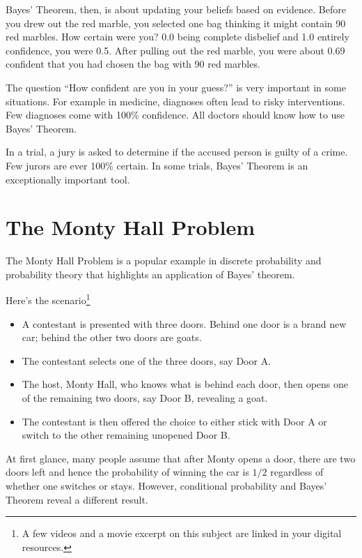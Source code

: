 Bayes' Theorem, then, is about updating your beliefs based on
evidence.  Before you drew out the red marble, you selected one bag
thinking it might contain 90 red marbles. How certain were you? 0.0 being complete disbelief and 1.0 entirely
confidence, you were 0.5. After pulling out the red marble, you were about 0.69
confident that you had chosen the bag with 90 red marbles.

The question ``How confident are you in your guess?'' is very
important in some situations. For example in medicine, diagnoses often
lead to risky interventions. Few diagnoses come with 100\% confidence.
All doctors should know how to use Bayes' Theorem. 

In a trial, a jury is asked to determine if the accused person is
guilty of a crime. Few jurors are ever 100\% certain. In some trials, Bayes'
Theorem is an exceptionally important tool.

\section{The Monty Hall Problem}

The Monty Hall Problem is a popular example in discrete probability and probability theory that highlights an application of Bayes' theorem. 

Here's the scenario\footnote{A few videos and a movie excerpt on this subject are linked in your digital resources.}
\begin{itemize}
    \item A contestant is presented with three doors. Behind one door is a brand new car; behind the other two doors are goats.
    \item The contestant selects one of the three doors, say Door A.
    \item The host, Monty Hall, who knows what is behind each door, then opens one of the remaining two doors, say Door B, revealing a goat.
    \item The contestant is then offered the choice to either stick with Door A or switch to the other remaining unopened Door B.
\end{itemize}

At first glance, many people assume that after Monty opens a door, there are two
doors left and hence the probability of winning the car is $1/2$ regardless of
whether one switches or stays. However, conditional probability and Bayes' Theorem reveal a different result.

